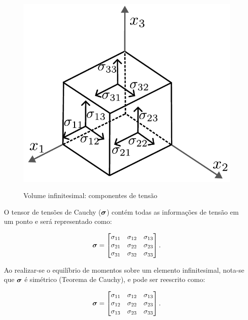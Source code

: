 \begin{figure}[!htbp]
	\caption{Volume infinitesimal: componentes de tensão}
	\centering
	\includegraphics[scale=0.5,trim=0cm 0.0cm 0cm 0cm, clip=true]{Imagens/Cap4/sol_vol_equi.pdf}	
	\label{fig:sol_equi}
\end{figure}

O tensor de tensões de Cauchy ($\bm{\sigma}$) contém todas as informações de tensão em um ponto e será representado como:

\begin{align}
\bm{\sigma} =
\begin{bmatrix}
	\sigma_{11} & \sigma_{12} & \sigma_{13} \\
	\sigma_{21} & \sigma_{22} & \sigma_{23} \\
	\sigma_{31} & \sigma_{32} & \sigma_{33}
\end{bmatrix}
.
\end{align}

Ao realizar-se o equilíbrio de momentos sobre um elemento infinitesimal, nota-se que $\bm{\sigma}$ é simétrico (Teorema de Cauchy), e pode ser reescrito como:

\begin{align}
	\bm{\sigma} =
	\begin{bmatrix}
		\sigma_{11} & \sigma_{12} & \sigma_{13} \\
		\sigma_{12} & \sigma_{22} & \sigma_{23} \\
		\sigma_{13} & \sigma_{23} & \sigma_{33}
	\end{bmatrix}
	.
\end{align}

